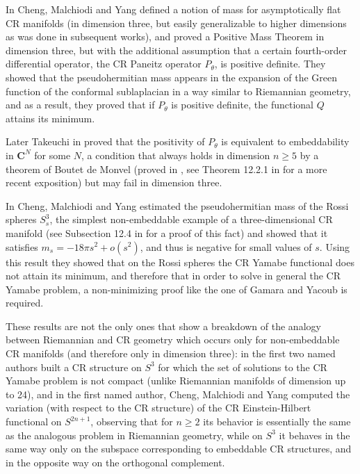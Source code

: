\documentclass[a4paper,12pt]{amsart}
\newcommand{\C}{\mathbf{C}}
\newcommand{\rosso}[1]{{\color{red}#1}}
\begin{document}
In \cite{CMY1} Cheng, Malchiodi and Yang defined a notion of mass for asymptotically flat CR manifolds (in dimension three, but easily generalizable to higher dimensions as was done in subsequent works), and proved a Positive Mass Theorem
in dimension three,
but with the additional assumption that a certain fourth-order differential operator, the CR Paneitz operator $P_{\theta}$, is positive definite.
They showed that the pseudohermitian mass appears in the expansion of the Green function of the conformal sublaplacian in a way similar to Riemannian geometry, and as a result, they proved that if $P_{\theta}$ is positive definite, the functional $Q$ attains its minimum. 




Later Takeuchi in \cite{T} proved that the positivity of $P_{\theta}$ is equivalent to embeddability in $\C^N$ for some $N$, a condition that always holds in dimension $n\ge 5$ by a theorem of Boutet de Monvel (proved in \cite{BdM}, see Theorem 12.2.1 in \cite{CS} for a more recent exposition) but may fail in dimension three.

In \cite{CMY2} Cheng, Malchiodi and Yang estimated the pseudohermitian mass
of the Rossi spheres $S^3_s$, the simplest non-embeddable example of a three-dimensional CR manifold (see Subsection 12.4 in \cite{CS} for a proof of this fact) and showed that it satisfies $m_s=-18\pi s^2+o(s^2)$, and thus  is negative for small values of $s$.
Using this result they showed that on the Rossi spheres the CR Yamabe functional does not attain its minimum, and therefore that in order to solve in general the CR Yamabe problem, a non-minimizing proof like the one of Gamara and Yacoub is required.

These results are not the only ones that show a breakdown of the analogy between Riemannian and CR geometry which occurs only for non-embeddable CR manifolds (and therefore only in dimension three): in \cite{AP} the first two named authors built a CR structure on $S^3$ for which the set of solutions to the CR Yamabe problem is not compact (unlike Riemannian manifolds of dimension up to 24), and in \cite{ACMY} the first named author, Cheng, Malchiodi and Yang computed the variation (with respect to the CR structure) of the CR Einstein-Hilbert functional on $S^{2n+1}$, observing that for $n\ge 2$ its behavior is essentially the same as the analogous problem in Riemannian geometry, while on $S^3$ it behaves in the same way only on the subspace corresponding to embeddable CR structures, and in the opposite way on the orthogonal complement.
\end{document}
